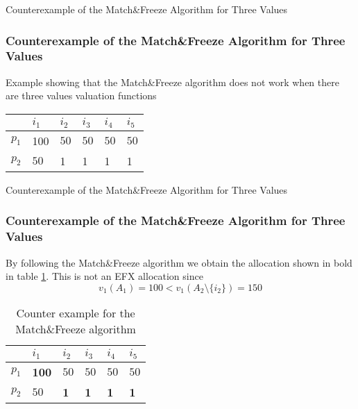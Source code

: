 \begin{frame}{Counterexample of the Match\&Freeze Algorithm for Three Values}
\frametitle{Counterexample of the Match\&Freeze Algorithm for Three Values}
Example showing that the Match\&Freeze algorithm does not work when there are three values valuation functions 
\begin{table}[h]
\centering
\begin{tabular}{|l|l|l|l|l|l|}
\hline
      & $i_1$ & $i_2$ & $i_3$ & $i_4$ & $i_5$ \\ \hline
$p_1$ & 100 & $50$   & $50$   & $50$   & $50$   \\ \hline
$p_2$ & $50$   & 1   & 1   & 1   & 1   \\ \hline
\end{tabular}
\end{table}

\end{frame}

\begin{frame}{Counterexample of the Match\&Freeze Algorithm for Three Values}
\frametitle{Counterexample of the Match\&Freeze Algorithm for Three Values}

By following the Match\&Freeze algorithm we obtain the allocation shown in bold in table \ref{table:counter-example-match-and-freeze-three-values}. This is not an EFX allocation since 
$$v_1(A_1) = 100 < v_1(A_2\setminus \{i_2\}) = 150$$

\begin{table}[h]
\centering
\begin{tabular}{|l|l|l|l|l|l|}
\hline
      & $i_1$ & $i_2$ & $i_3$ & $i_4$ & $i_5$ \\ \hline
$p_1$ & \textbf{100}   & $50$   & $50$   & $50$   & $50$   \\ \hline
$p_2$ & $50$   & \textbf{1}   & \textbf{1}   & \textbf{1}   & \textbf{1}   \\ \hline
\end{tabular}
\caption{Counter example for the Match\&Freeze algorithm}
\label{table:counter-example-match-and-freeze-three-values}
\end{table}

\end{frame}

